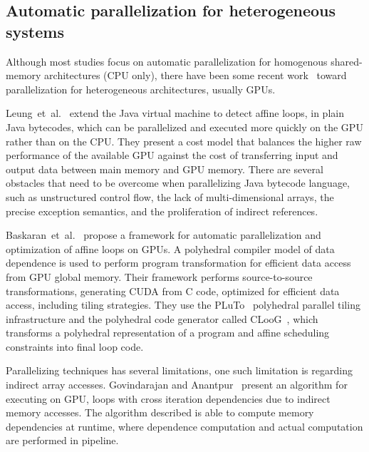 \documentclass[a4paper,12pt]{article}
\newcommand{\etal}{et~al.}
\begin{document}
\subsection{Automatic parallelization for heterogeneous systems}

Although most studies focus on automatic parallelization for homogenous shared-memory architectures (CPU only),
there have been some recent work~\cite{leung09,baskaran10,amini12,govindarajan13}
toward parallelization for heterogeneous architectures, usually GPUs.

Leung~\etal~\cite{leung09} extend the Java virtual machine to detect affine
loops, in plain Java bytecodes, which can be parallelized and executed more
quickly on the GPU rather than on the CPU.  They present a cost model that
balances the higher raw performance of the available GPU against the cost of
transferring input and output data between main memory and GPU memory.  There
are several obstacles that need to be overcome when parallelizing Java bytecode
language, such as unstructured control flow, the lack of multi-dimensional
arrays, the precise exception semantics, and the proliferation of indirect
references.

Baskaran~\etal~\cite{baskaran08,baskaran10} propose a framework for automatic
parallelization and optimization of affine loops on GPUs. A polyhedral compiler
model of data dependence is used to perform program transformation for
efficient data access from GPU global memory.  Their framework performs
source-to-source transformations, generating CUDA from C code, optimized for
efficient data access, including tiling strategies.  They use the
PLuTo~\cite{bondhugula08} polyhedral parallel tiling infrastructure and the
polyhedral code generator called CLooG~\cite{bastoul04}, which transforms a
polyhedral representation of a program and affine scheduling constraints into
final loop code.

Parallelizing techniques has several limitations, one such limitation is
regarding indirect array accesses.  Govindarajan and
Anantpur~\cite{govindarajan13} present an algorithm for executing on GPU, loops
with cross iteration dependencies due to indirect memory accesses.  The
algorithm described is able to compute memory dependencies at runtime, where
dependence computation and actual computation are performed in pipeline.

%
\end{document}

